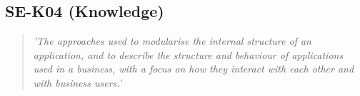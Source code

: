 \subsection{SE-K04 (Knowledge)}

  \begin{quote}
    \textit{'The approaches used to modularise the internal
    structure of an application, and to describe the structure
    and behaviour of applications used in a business, with a
    focus on how they interact with each other and with
    business users.'}
  \end{quote}

\newpage